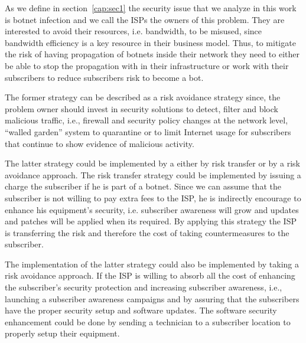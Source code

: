 \label{cap:sec3}
As we define in section~\ref{cap:sec1} the security issue that we analyze in this work is botnet infection and we call the ISPs the owners of this problem.
They are interested to avoid their resources, i.e. bandwidth, to be misused, since bandwidth efficiency is a key resource in their business model. Thus,  to mitigate the risk of having propagation of botnets inside their network they need to either be able to stop the propagation with in their infrastructure or work with their subscribers to reduce subscribers risk to become a bot.

The former strategy can be described as a risk avoidance strategy since, the problem owner should invest in security solutions to detect, filter and block malicious traffic, i.e., firewall and security policy changes at the network level, “walled garden” system to quarantine or to limit Internet usage for subscribers that continue to show evidence of malicious activity. %

The latter strategy could be implemented by a either by risk transfer or by a risk avoidance approach. The risk transfer strategy could be implemented by issuing a charge the subscriber if he is part of a botnet. Since we can assume that the subscriber is not willing to pay extra fees to the ISP, he is indirectly encourage to enhance his equipment's security, i.e. subscriber awareness will grow and updates and patches will be applied when its required. By applying this strategy the ISP is transferring the risk and therefore the cost of taking countermeasures to the subscriber.

The implementation of the latter strategy could also be implemented by taking a risk avoidance approach. If the ISP is willing to absorb all the cost of enhancing the subscriber's security protection and increasing subscriber awareness, i.e., launching a  subscriber awareness campaigns and by assuring that the subscribers have the proper security setup and software updates. The software security enhancement could be done by sending a technician to a subscriber location to properly setup their equipment.




